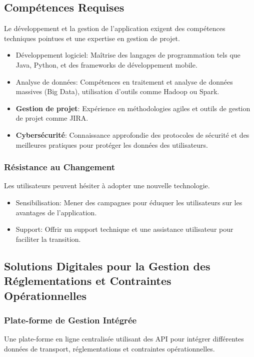 \subsection*{Compétences Requises}
Le développement et la gestion de l'application exigent des compétences techniques pointues et une expertise en gestion de projet.
\begin{itemize}
    \item Développement logiciel: Maîtrise des langages de programmation tels que Java, Python, et des frameworks de développement mobile.
    \item Analyse de données: Compétences en traitement et analyse de données massives (Big Data), utilisation d'outils comme Hadoop ou Spark.
    \item \textbf{Gestion de projet}: Expérience en méthodologies agiles et outils de gestion de projet comme JIRA.
    \item \textbf{Cybersécurité}: Connaissance approfondie des protocoles de sécurité et des meilleures pratiques pour protéger les données des utilisateurs.
\end{itemize}

\subsubsection*{Résistance au Changement}
Les utilisateurs peuvent hésiter à adopter une nouvelle technologie.
\begin{itemize}
    \item Sensibilisation: Mener des campagnes pour éduquer les utilisateurs sur les avantages de l'application.
    \item Support: Offrir un support technique et une assistance utilisateur pour faciliter la transition.
\end{itemize}

\subsection{Solutions Digitales pour la Gestion des Réglementations et Contraintes Opérationnelles}

\subsubsection*{Plate-forme de Gestion Intégrée}
Une plate-forme en ligne centralisée utilisant des API pour intégrer différentes données de transport, réglementations et contraintes opérationnelles.


